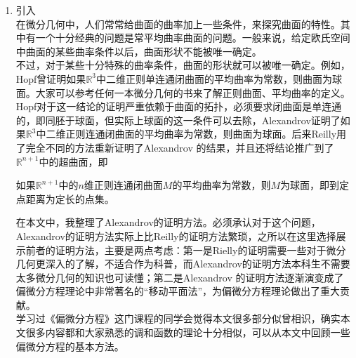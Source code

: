 

\begin{enumerate}
\item 引入\\
在微分几何\cite{1}中，人们常常给曲面的曲率加上一些条件，来探究曲面的特性。其中有一个十分经典的问题是常平均曲率曲面的问题。一般来说，给定欧氏空间中曲面的某些曲率条件以后，曲面形状不能被唯一确定。\\
不过，对于某些十分特殊的曲率条件，曲面的形状就可以被唯一确定。例如，Hopf曾证明如果$\mathbb{R}^{3}$中二维正则单连通闭曲面的平均曲率为常数，则曲面为球面。大家可以参考任何一本微分几何的书来了解正则曲面、平均曲率的定义。\\
Hopf对于这一结论的证明严重依赖于曲面的拓扑，必须要求闭曲面是单连通的，即同胚于球面，但实际上球面的这一条件可以去除，Alexandrov证明了如果$\mathbb{R}^{3}$中二维正则连通闭曲面的平均曲率为常数，则曲面为球面。后来Reilly用了完全不同的方法重新证明了Alexandrov 的结果，并且还将结论推广到了$\mathbb{R}^{n+1}$中的超曲面，即
\begin{theorem}
如果$\mathbb{R}^{n+1}$中的$n$维正则连通闭曲面$M$的平均曲率为常数，则$M$为球面，即到定点距离为定长的点集。
\end{theorem}
在本文中，我整理了Alexandrov的证明方法。必须承认对于这个问题，Alexandrov的证明方法实际上比Reilly的证明方法繁琐，之所以在这里选择展示前者的证明方法，主要是两点考虑：第一是Rielly的证明需要一些对于微分几何更深入的了解，不适合作为科普，而Alexandrov的证明方法本科生不需要太多微分几何的知识也可读懂；第二是Alexandrov 的证明方法逐渐演变成了偏微分方程理论中非常著名的“移动平面法”，为偏微分方程理论做出了重大贡献。\\
学习过《偏微分方程》这门课程的同学会觉得本文很多部分似曾相识，确实本文很多内容都和大家熟悉的调和函数的理论十分相似，可以从本文中回顾一些偏微分方程的基本方法。





\end{enumerate}
